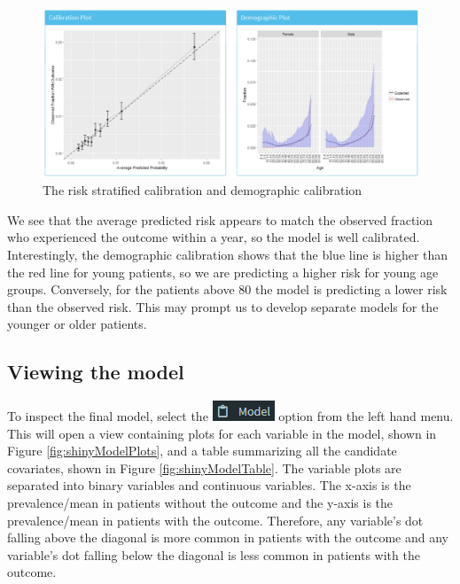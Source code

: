\documentclass[11pt]{book}
\theoremstyle{definition}
\theoremstyle{definition}
\theoremstyle{definition}
\theoremstyle{remark}
\begin{document}
\begin{figure}

{\centering \includegraphics[width=1\linewidth]{images/PatientLevelPrediction/shiny/shinyPerformanceCal} 

}

\caption{The risk stratified calibration and demographic calibration}\label{fig:shinyPerformanceCal}
\end{figure}

We see that the average predicted risk appears to match the observed fraction who experienced the outcome within a year, so the model is well calibrated. Interestingly, the demographic calibration shows that the blue line is higher than the red line for young patients, so we are predicting a higher risk for young age groups. Conversely, for the patients above 80 the model is predicting a lower risk than the observed risk. This may prompt us to develop separate models for the younger or older patients.

\hypertarget{viewing-the-model}{%
\subsection{Viewing the model}\label{viewing-the-model}}

To inspect the final model, select the \includegraphics{images/PatientLevelPrediction/modelButton.png} option from the left hand menu. This will open a view containing plots for each variable in the model, shown in Figure \ref{fig:shinyModelPlots}, and a table summarizing all the candidate covariates, shown in Figure \ref{fig:shinyModelTable}. The variable plots are separated into binary variables and continuous variables. The x-axis is the prevalence/mean in patients without the outcome and the y-axis is the prevalence/mean in patients with the outcome. Therefore, any variable's dot falling above the diagonal is more common in patients with the outcome and any variable's dot falling below the diagonal is less common in patients with the outcome.
\end{document}
